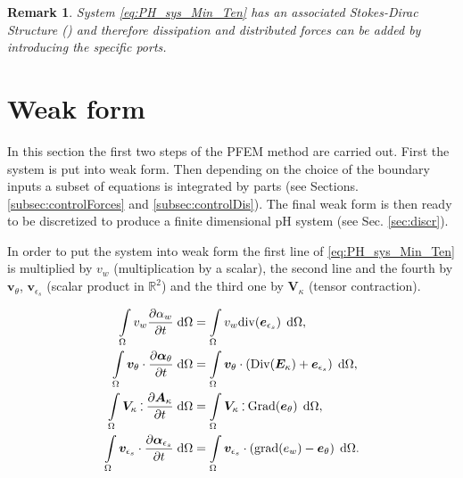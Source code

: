 \documentclass{ifacconf}
\newtheorem{remark}{Remark}
\def\onedot{$\mathsurround0pt\ldotp$}
\def\cddot{%
	\mathbin{\vcenter{\baselineskip.67ex
			\hbox{\onedot}\hbox{\onedot}}%
}}
\begin{document}
 \begin{remark}
System \eqref{eq:PH_sys_Min_Ten} has an associated Stokes-Dirac Structure (\cite{MacchelliMindlin}) and therefore dissipation and distributed forces can be added by introducing the specific ports.
 \end{remark}

\section{Weak form}
In this section the first two steps of the PFEM method are carried out. First the system is put into weak form. Then depending on the choice of the boundary inputs a subset of equations is integrated by parts (see Sections. \ref{subsec:controlForces} and \ref{subsec:controlDis}). The final weak form is then ready to be discretized to produce a finite dimensional pH system (see Sec. \ref{sec:discr}).

In order to put the system into weak form the first line of \eqref{eq:PH_sys_Min_Ten} is multiplied  by $v_w$ (multiplication by a scalar), the second line and the fourth by $\bm{v}_{\theta}$, $\bm{v}_{\epsilon_s}$ (scalar product in $\mathbb{R}^2$) and the third one by $\bm{V}_{\kappa}$ (tensor contraction).

\begin{align}
\int_{\Omega} v_w \diffp{\alpha_w}{t}  \d\Omega &=  \int_{\Omega} v_w \mathrm{div}(\bm{e}_{\epsilon_s}) \, \d\Omega,  \label{eq:wf1_min_ten}\\
\int_{\Omega} \bm{v}_{\theta} \cdot \diffp{\bm\alpha_{\theta}}{t}   \d\Omega &= \int_{\Omega} \bm{v}_{\theta} \cdot (\mathrm{Div}( \bm{E}_{\kappa}) + \bm{e}_{\epsilon_s}) \,  \d\Omega,  \label{eq:wf2_min_ten} \\
\int_{\Omega} \bm{V}_{\kappa} \cddot \diffp{\bm{A}_{\kappa}}{t}   \d\Omega &= \int_{\Omega} \bm{V}_{\kappa} \cddot \mathrm{Grad}(\bm{e}_\theta) \, \d\Omega, \label{eq:wf3_min_ten} \\
\int_{\Omega} \bm{v}_{\epsilon_s} \cdot \diffp{\bm\alpha_{\epsilon_s}}{t}   \d\Omega &= \int_{\Omega} \bm{v}_{\epsilon_s} \cdot (\mathrm{grad}({e}_{w}) - \bm{e}_{\theta}) \, \d\Omega.  \label{eq:wf4_min_ten}
\end{align}
\end{document}
